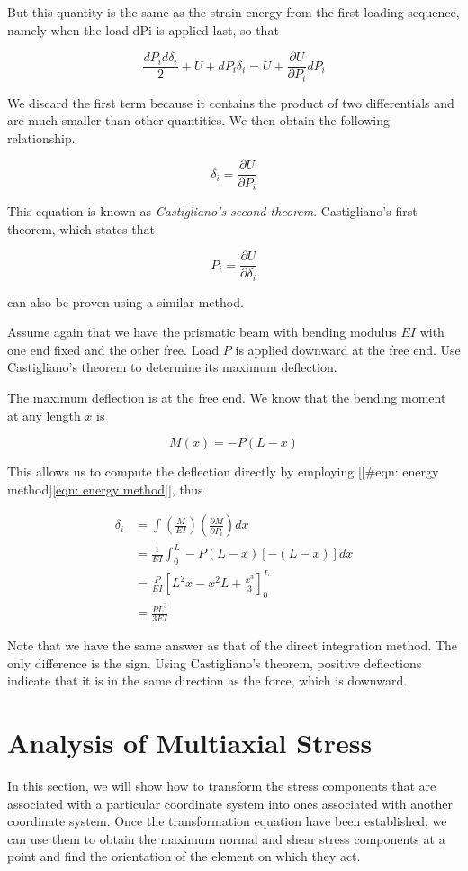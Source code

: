 \documentclass[a4paper,openany,12pt]{book}
\begin{document}
\begin{enumerate}
But this quantity is the same as the strain energy from the first
loading sequence, namely when the load dPi is applied last, so that

$$\frac{dP_id\delta _i}{2} + U + dP_i\delta_i = U + \frac{\partial U}{\partial P_i}dP_i$$

We discard the first term because it contains the product of two
differentials and are much smaller than other quantities. We then obtain
the following relationship.

$$\delta_i = \frac{\partial U}{\partial P_i}$$

This equation is known as \emph{Castigliano's second theorem}. Castigliano's
first theorem, which states that

$$P_i = \frac{\partial U}{\partial \delta_i}$$

can also be proven using a similar method.

Assume again that we have the prismatic beam with bending modulus \(EI\)
with one end fixed and the other free. Load \(P\) is applied downward at
the free end. Use Castigliano's theorem to determine its maximum
deflection.

The maximum deflection is at the free end. We know that the bending
moment at any length \(x\) is

$$M(x) =  - P(L - x)$$

This allows us to compute the deflection directly by employing
[[\#eqn: energy method]\ref{eqn: energy method}], thus

$$\begin{aligned}
  \delta_i &= \int \left( \frac{M}{EI} \right) \left( \frac{\partial M}{\partial P_i} \right)dx \\ 
              &= \frac{1}{EI}\int_0^L  - P(L - x)[ - (L - x)]dx  \\ 
              &= \frac{P}{EI}\left[ L^2x - x^2L + \frac{x^3}{3} \right]_0^L \\ 
              &= \frac{PL^3}{3EI} \end{aligned}$$

Note that we have the same answer as that of the direct integration
method. The only difference is the sign. Using Castigliano's theorem,
positive deflections indicate that it is in the same direction as the
force, which is downward.
\end{enumerate}

\section{Analysis of Multiaxial Stress}
\label{section: multiaxial stress}
In this section, we will show how to transform the stress components
that are associated with a particular coordinate system into ones
associated with another coordinate system. Once the transformation
equation have been established, we can use them to obtain the maximum
normal and shear stress components at a point and find the orientation
of the element on which they act.
\end{document}
